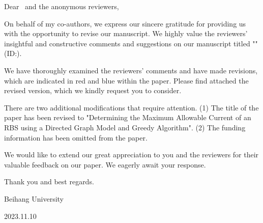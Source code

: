 \noindent Dear \editorname \, and the anonymous reviewers,

On behalf of my co-authors, we express our sincere gratitude for providing us with the opportunity to revise our manuscript. We highly value the reviewers' insightful and constructive comments and suggestions on our manuscript titled "\thetitle" (ID:\manuscript).

We have thoroughly examined the reviewers' comments and have made revisions, which are indicated in red and blue within the paper. Please find attached the revised version, which we kindly request you to consider.

There are two additional modifications that require attention.
(1) The title of the paper has been revised to "Determining the Maximum Allowable Current of an RBS using a Directed Graph Model and Greedy Algorithm".
(2) The funding information has been omitted from the paper.

We would like to extend our great appreciation to you and the reviewers for their valuable feedback on our paper. We eagerly await your response.

Thank you and best regards.
\begin{flushright}
\theauthor

Beihang University

2023.11.10
\end{flushright}